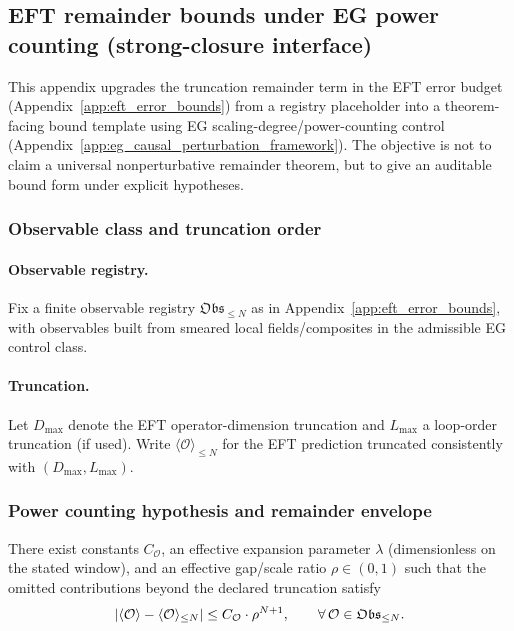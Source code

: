 \subsection{EFT remainder bounds under EG power counting (strong-closure interface)}
\label{app:strong_eft_remainder_bounds}

\AuditTag This appendix upgrades the truncation remainder term in the EFT error budget (Appendix~\ref{app:eft_error_bounds}) from a registry placeholder into a theorem-facing bound template using EG scaling-degree/power-counting control (Appendix~\ref{app:eg_causal_perturbation_framework}).
The objective is not to claim a universal nonperturbative remainder theorem, but to give an auditable bound form under explicit hypotheses.

\subsubsection{Observable class and truncation order}
\paragraph{Observable registry.}
Fix a finite observable registry $\mathfrak{Obs}_{\le N}$ as in Appendix~\ref{app:eft_error_bounds}, with observables built from smeared local fields/composites in the admissible EG control class.

\paragraph{Truncation.}
Let $D_{\max}$ denote the EFT operator-dimension truncation and $L_{\max}$ a loop-order truncation (if used).
Write $\langle \mathcal{O}\rangle_{\le N}$ for the EFT prediction truncated consistently with $(D_{\max},L_{\max})$.

\subsubsection{Power counting hypothesis and remainder envelope}
\begin{assumption}
\label{ass:power_counting_remainder_envelope}
There exist constants $C_{\mathcal{O}}$, an effective expansion parameter $\lambda$ (dimensionless on the stated window), and an effective gap/scale ratio $\rho\in(0,1)$ such that the omitted contributions beyond the declared truncation satisfy
\[
\left\lvert \langle \mathcal{O}\rangle-\langle \mathcal{O}\rangle_{\le N}\right\rvert
\le
C_{\mathcal{O}}\cdot \rho^{N+1},
\qquad \forall\,\mathcal{O}\in\mathfrak{Obs}_{\le N}.
\]
\end{assumption}

